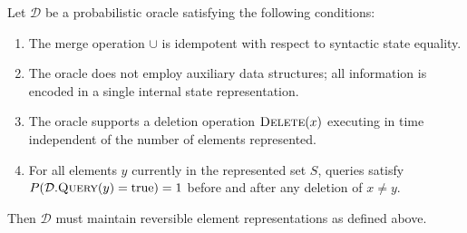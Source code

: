 \begin{theorem}
    \label{thm:incompatibility}
    Let $\mathcal{D}$ be a probabilistic oracle satisfying the following conditions:
    \begin{enumerate}
        \item[(1)] The merge operation $\cup$ is idempotent with respect to syntactic state equality.
        \item[(2)] The oracle does not employ auxiliary data structures; all information is encoded in a single internal state representation.
        \item[(3)] The oracle supports a deletion operation $\textsc{Delete}(x)$ executing in time independent of the number of elements represented.
        \item[(4)] For all elements $y$ currently in the represented set $S$, queries satisfy $P(\mathcal{D}.\textsc{Query}(y) = \text{true}) = 1$ before and after any deletion of $x \neq y$.
    \end{enumerate}
    Then $\mathcal{D}$ must maintain reversible element representations as defined above.
\end{theorem}

